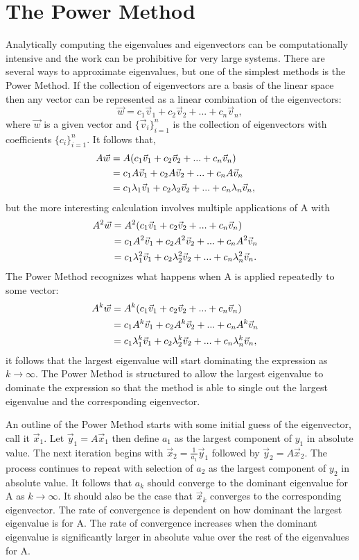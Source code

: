 \documentclass[twoside]{article}
\def\ds{\displaystyle}
\begin{document}
\section{The Power Method}
Analytically computing the eigenvalues and eigenvectors can be computationally intensive and the work can be prohibitive for very large systems. There are several ways to approximate eigenvalues, but one of the simplest methods is the Power Method. If the collection of eigenvectors are a basis of the linear space then any vector can be represented as a linear combination of the eigenvectors:
$$\vec w = c_1 \vec v_1 + c_2 \vec v_2 + ... + c_n \vec v_n,$$
where $\ds \vec w$ is a given vector and $\ds \{ \vec v_i\}_{i=1}^n$ is the collection of eigenvectors with coefficients $\ds \{ c_i\}_{i=1}^n$. It follows that,
\begin{align*}
    A\vec w &= A(c_1 \vec v_1 + c_2 \vec v_2 + ... + c_n \vec v_n) \cr
    &=c_1 A \vec v_1 + c_2 A \vec v_2 + ... + c_n A\vec v_n \cr
     &=c_1 \lambda_1 \vec v_1 + c_2 \lambda_2 \vec v_2 + ... + c_n \lambda_n \vec v_n, 
\end{align*}
but the more interesting calculation involves multiple applications of A with
\begin{align*}
    A^2\vec w &= A^2(c_1 \vec v_1 + c_2 \vec v_2 + ... + c_n \vec v_n) \cr
    &=c_1 A^2 \vec v_1 + c_2 A^2 \vec v_2 + ... + c_n A^2\vec v_n \cr
     &=c_1 \lambda_1^2 \vec v_1 + c_2 \lambda_2^2 \vec v_2 + ... + c_n \lambda_n^2 \vec v_n.
\end{align*}
The Power Method recognizes what happens when A is applied repeatedly to some vector:
\begin{align*}
    A^k\vec w &= A^k(c_1 \vec v_1 + c_2 \vec v_2 + ... + c_n \vec v_n) \cr
    &=c_1 A^k \vec v_1 + c_2 A^k \vec v_2 + ... + c_n A^k\vec v_n \cr
     &=c_1 \lambda_1^k \vec v_1 + c_2 \lambda_2^k \vec v_2 + ... + c_n \lambda_n^k \vec v_n,
\end{align*}
it follows that the largest eigenvalue will start dominating the expression as $k\rightarrow \infty$. The Power Method is structured to allow the largest eigenvalue to dominate the expression so that the method is able to single out the largest eigenvalue and the corresponding eigenvector. 

An outline of the Power Method starts with some initial guess of the eigenvector, call it $\ds \vec x_1$. Let $\ds \vec y_1 = A \vec x_1$ then define $\ds a_1$ as the largest component of $\ds y_1$ in absolute value. The next iteration begins with $\ds \vec x_2 = \frac 1{a_1} \vec y_1$ followed by $\ds \vec y_2 = A \vec x_2$. The process continues to repeat with selection of $\ds a_2$ as the largest component of $\ds y_2$ in absolute value. It follows that $\ds a_k$ should converge to the dominant eigenvalue for A as $\ds k\rightarrow \infty$. It should also be the case that $\ds \vec x_k$ converges to the corresponding eigenvector. The rate of convergence is dependent on how dominant the largest eigenvalue is for A. The rate of convergence increases when the dominant eigenvalue is significantly larger in absolute value over the rest of the eigenvalues for A. 
\end{document}
